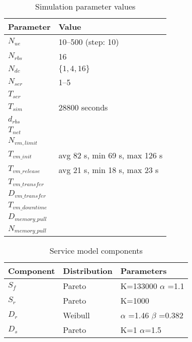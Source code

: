 \begin{table}[tb]
 	\centering
 	
    \begin{tabular}{|l|l|} \hline
    	\textbf{Parameter}    	& \textbf{Value}			\\ \hline
    	$N_{ue}$						& 10--500 (step: 10)	\\ \hline
    	$N_{rbs}$						& 16								\\ \hline
    	$N_{dc}$						& $\{1,4,16\}$				\\ \hline
    	$N_{ser}$						& 1--5							\\ \hline
    	$T_{ser}$						& \\ \hline
    	$T_{sim}$						& 28800 seconds\\ \hline
    	$d_{rbs}$						& \\ \hline
    	$T_{net}$						& \\ \hline
        $N_{vm,limit}$                  & \\ \hline
        $T_{vm\_init}$				& avg 82 s, min 69 s, max 126 s \\ \hline
        $T_{vm\_release}$		& avg 21 s, min 18 s, max 23 s \\ \hline
        $T_{vm\_transfer}$		& \\ \hline
		$D_{vm\_transfer}$		& \\ \hline
		$T_{vm\_downtime}$	& \\ \hline
		$D_{memory\_pull}$	& \\ \hline
		$N_{memory\_pull}$	& \\ \hline
    \end{tabular}
    
    \caption{Simulation parameter values}
    \label{table:simulation_parameters}
\end{table}

\begin{table}[tb]
	\centering
	
    \begin{tabular}{|l|l|l|}\hline
    	\textbf{Component}  	& \textbf{Distribution} 	& \textbf{Parameters}     \\ \hline
    	$S_f$   & Pareto   				    & K=133000 $\alpha$ =1.1  \\ \hline
    	$S_r$   & Pareto    				& K=1000         \\ \hline
    	$D_r$ 	& Weibull    				& $\alpha$ =1.46 $\beta$ =0.382 \\ \hline
    	$D_s$ 	& Pareto     				& K=1 $\alpha$=1.5      \\ \hline
    \end{tabular}
    

    \caption{Service model components}
    \label{table:traffic_parameters}
\end{table}

